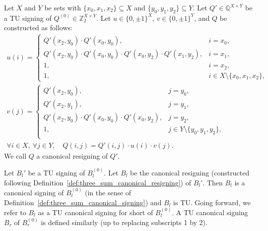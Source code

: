 \begin{definition}\label{def:three_sum_canonical_resigning}
    Let $X$ and $Y$ be sets with $\{x_{0}, x_{1}, x_{2}\} \subseteq X$ and $\{y_{0}, y_{1}, y_{2}\} \subseteq Y$. Let $Q' \in \mathbb{Q}^{X \times Y}$ be a TU signing of $Q^{(0)} \in \mathbb{Z}_{2}^{X \times Y}$. Let $u \in \{0, \pm 1\}^{X}$, $v \in \{0, \pm 1\}^{Y}$, and $Q$ be constructed as follows:
    \begin{gather*}
        u(i) = \begin{cases}
            Q' (x_{2}, y_{0}) \cdot Q' (x_{0}, y_{0}), & i = x_{0}, \\
            Q' (x_{2}, y_{0}) \cdot Q' (x_{0}, y_{0}) \cdot Q' (x_{0}, y_{2}) \cdot Q' (x_{1}, y_{2}), & i = x_{1}, \\
            1, & i = x_{2}, \\
            1, & i \in X \setminus \{x_{0}, x_{1}, x_{2}\},
        \end{cases} \\
        v(j) = \begin{cases}
            Q' (x_{2}, y_{0}), & j = y_{0}, \\
            Q' (x_{2}, y_{1}), & j = y_{1}, \\
            Q' (x_{2}, y_{0}) \cdot Q' (x_{0}, y_{0}) \cdot Q' (x_{0}, y_{2}), & j = y_{2}, \\
            1, & j \in Y \setminus \{y_{0}, y_{1}, y_{2}\}, \\
        \end{cases} \\
        \forall i \in X, \ \forall j \in Y, \quad Q (i, j) = Q' (i, j) \cdot u(i) \cdot v(j).
    \end{gather*}
    We call $Q$ a canonical resigning of $Q'$.
\end{definition}

\begin{lemma}\label{lem:three_sum_canonical_signing_construction}
    Let $B_{l}'$ be a TU signing of $B_{l}^{(0)}$. Let $B_{l}$ be the canonical resigning (constructed following Definition~\ref{def:three_sum_canonical_resigning}) of $B_{l}'$. Then $B_{l}$ is a canonical signing of $B_{l}^{(0)}$ (in the sense of Definition~\ref{def:three_sum_canonical_signing}) and $B_{l}$ is TU. Going forward, we refer to $B_{l}$ as a TU canonical signing for short of $B_{l}^{(0)}$. A TU canonical signing $B_{r}$ of $B_{r}^{(0)}$ is defined similarly (up to replacing subscripts 1 by 2).
\end{lemma}

